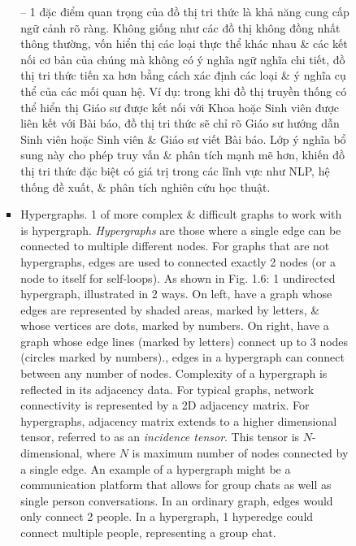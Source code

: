 \documentclass{article}
\begin{document}
\begin{itemize}
\begin{itemize}
\begin{itemize}
\begin{itemize}
                -- 1 đặc điểm quan trọng của đồ thị tri thức là khả năng cung cấp ngữ cảnh rõ ràng. Không giống như các đồ thị không đồng nhất thông thường, vốn hiển thị các loại thực thể khác nhau \& các kết nối cơ bản của chúng mà không có ý nghĩa ngữ nghĩa chi tiết, đồ thị tri thức tiến xa hơn bằng cách xác định các loại \& ý nghĩa cụ thể của các mối quan hệ. Ví dụ: trong khi đồ thị truyền thống có thể hiển thị Giáo sư được kết nối với Khoa hoặc Sinh viên được liên kết với Bài báo, đồ thị tri thức sẽ chỉ rõ Giáo sư hướng dẫn Sinh viên hoặc Sinh viên \& Giáo sư viết Bài báo. Lớp ý nghĩa bổ sung này cho phép truy vấn \& phân tích mạnh mẽ hơn, khiến đồ thị tri thức đặc biệt có giá trị trong các lĩnh vực như NLP, hệ thống đề xuất, \& phân tích nghiên cứu học thuật.
                \item {\sf Hypergraphs.} 1 of more complex \& difficult graphs to work with is hypergraph. {\it Hypergraphs} are those where a single edge can be connected to multiple different nodes. For graphs that are not hypergraphs, edges are used to connected exactly 2 nodes (or a node to itself for self-loops). As shown in {\sf Fig. 1.6: 1 undirected hypergraph, illustrated in 2 ways. On left, have a graph whose edges are represented by shaded areas, marked by letters, \& whose vertices are dots, marked by numbers. On right, have a graph whose edge lines (marked by letters) connect up to 3 nodes (circles marked by numbers).}, edges in a hypergraph can connect between any number of nodes. Complexity of a hypergraph is reflected in its adjacency data. For typical graphs, network connectivity is represented by a 2D adjacency matrix. For hypergraphs, adjacency matrix extends to a higher dimensional tensor, referred to as an {\it incidence tensor}. This tensor is $N$-dimensional, where $N$ is maximum number of nodes connected by a single edge. An example of a hypergraph might be a communication platform that allows for group chats as well as single person conversations. In an ordinary graph, edges would only connect 2 people. In a hypergraph, 1 hyperedge could connect multiple people, representing a group chat.


\end{itemize}
\end{itemize}
\end{itemize}
\end{itemize}
\end{document}
